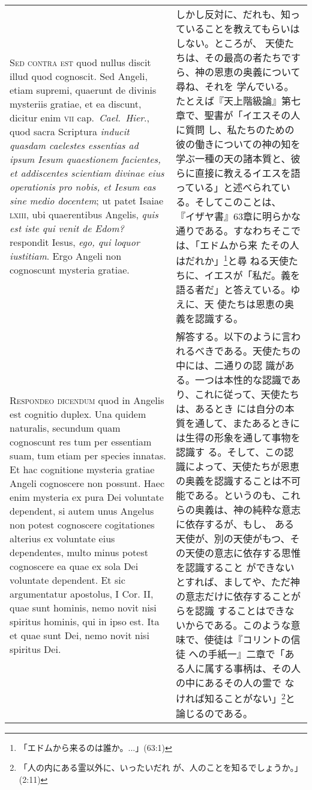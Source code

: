 \documentclass[10pt]{jsarticle} %
\begin{document}
\begin{longtable}{p{21em}p{21em}}
\\


{\scshape Sed contra est} quod nullus discit illud quod cognoscit. Sed
Angeli, etiam supremi, quaerunt de divinis mysteriis gratiae, et ea
discunt, dicitur enim {\scshape vii} cap.~{\itshape Cael.~Hier}., quod
sacra Scriptura {\itshape inducit quasdam caelestes essentias ad ipsum
Iesum quaestionem facientes, et addiscentes scientiam divinae eius
operationis pro nobis, et Iesum eas sine medio docentem}; ut patet
Isaiae {\scshape lxiii}, ubi quaerentibus Angelis, {\itshape quis est
iste qui venit de Edom?} respondit Iesus, {\itshape ego, qui loquor
iustitiam}. Ergo Angeli non cognoscunt mysteria gratiae.


&

しかし反対に、だれも、知っていることを教えてもらいはしない。ところが、
天使たちは、その最高の者たちですら、神の恩恵の奥義について尋ね、それを
学んでいる。たとえば『天上階級論』第七章で、聖書が「イエスその人に質問
し、私たちのための彼の働きについての神の知を学ぶ一種の天の諸本質と、彼
らに直接に教えるイエスを語っている」と述べられている。そしてこのことは、
『イザヤ書』63章に明らかな通りである。すなわちそこでは、「エドムから来
たその人はだれか」\footnote{「エドムから来るのは誰か。...」(63:1)}と尋
ねる天使たちに、イエスが「私だ。義を語る者だ」と答えている。ゆえに、天
使たちは恩恵の奥義を認識する。


\\


{\scshape Respondeo dicendum} quod in Angelis est cognitio duplex. Una
quidem naturalis, secundum quam cognoscunt res tum per essentiam suam,
tum etiam per species innatas. Et hac cognitione mysteria gratiae
Angeli cognoscere non possunt. Haec enim mysteria ex pura Dei
voluntate dependent, si autem unus Angelus non potest cognoscere
cogitationes alterius ex voluntate eius dependentes, multo minus
potest cognoscere ea quae ex sola Dei voluntate dependent. Et sic
argumentatur apostolus, I Cor. II, quae sunt hominis, nemo novit nisi
spiritus hominis, qui in ipso est. Ita et quae sunt Dei, nemo novit
nisi spiritus Dei.


&

解答する。以下のように言われるべきである。天使たちの中には、二通りの認
識がある。一つは本性的な認識であり、これに従って、天使たちは、あるとき
には自分の本質を通して、またあるときには生得の形象を通して事物を認識す
る。そして、この認識によって、天使たちが恩恵の奥義を認識することは不可
能である。というのも、これらの奥義は、神の純粋な意志に依存するが、もし、
ある天使が、別の天使がもつ、その天使の意志に依存する思惟を認識すること
ができないとすれば、ましてや、ただ神の意志だけに依存することがらを認識
することはできないからである。このような意味で、使徒は『コリントの信徒
への手紙一』二章で「ある人に属する事柄は、その人の中にあるその人の霊で
なければ知ることがない」\footnote{「人の内にある霊以外に、いったいだれ
が、人のことを知るでしょうか。」(2:11)}と論じるのである。


\end{longtable}
\end{document}
